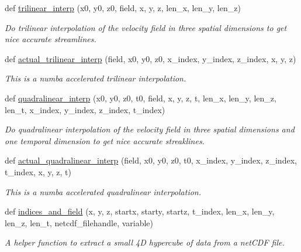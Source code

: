 \begin{DoxyCompactItemize}
def \hyperlink{namespacemitgcm_1_1streamlines_ab47d978fd4c41aa2c413b3f97fc7a7ac}{trilinear\+\_\+interp} (x0, y0, z0, field, x, y, z, len\+\_\+x, len\+\_\+y, len\+\_\+z)
\begin{DoxyCompactList}\small\item\em Do trilinear interpolation of the velocity field in three spatial dimensions to get nice accurate streamlines. \end{DoxyCompactList}\item 
def \hyperlink{namespacemitgcm_1_1streamlines_aa84595e731400d5c213a2cf663ed833d}{actual\+\_\+trilinear\+\_\+interp} (field, x0, y0, z0, x\+\_\+index, y\+\_\+index, z\+\_\+index, x, y, z)
\begin{DoxyCompactList}\small\item\em This is a numba accelerated trilinear interpolation. \end{DoxyCompactList}\item 
def \hyperlink{namespacemitgcm_1_1streamlines_a71006df0268068f667797deefae99b73}{quadralinear\+\_\+interp} (x0, y0, z0, t0, field, x, y, z, t, len\+\_\+x, len\+\_\+y, len\+\_\+z, len\+\_\+t, x\+\_\+index, y\+\_\+index, z\+\_\+index, t\+\_\+index)
\begin{DoxyCompactList}\small\item\em Do quadralinear interpolation of the velocity field in three spatial dimensions and one temporal dimension to get nice accurate streaklines. \end{DoxyCompactList}\item 
def \hyperlink{namespacemitgcm_1_1streamlines_aac1a8a54def68d4a7f0698c9809db4ef}{actual\+\_\+quadralinear\+\_\+interp} (field, x0, y0, z0, t0, x\+\_\+index, y\+\_\+index, z\+\_\+index, t\+\_\+index, x, y, z, t)
\begin{DoxyCompactList}\small\item\em This is a numba accelerated quadralinear interpolation. \end{DoxyCompactList}\item 
def \hyperlink{namespacemitgcm_1_1streamlines_ac29e083c45617ad0be326a556c549187}{indices\+\_\+and\+\_\+field} (x, y, z, startx, starty, startz, t\+\_\+index, len\+\_\+x, len\+\_\+y, len\+\_\+z, len\+\_\+t, netcdf\+\_\+filehandle, variable)
\begin{DoxyCompactList}\small\item\em A helper function to extract a small 4\+D hypercube of data from a net\+C\+D\+F file. \end{DoxyCompactList}\item 

\end{DoxyCompactItemize}
